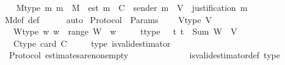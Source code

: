 \begin{isabellebody}
\endisatagproof
{\isafoldproof}%
%
\isadelimproof
\isanewline
%
\endisadelimproof
\isanewline
\ \ \isamarkupfalse%
\ M{\isacharunderscore}type{\isacharcolon}\ {\isachardoublequoteopen}{\isasymAnd}m{\isachardot}\ m\ {\isasymin}\ M\ {\isasymLongrightarrow}\ est\ m\ {\isasymin}\ C\ {\isasymand}\ sender\ m\ {\isasymin}\ V\ {\isasymand}\ justification\ m\ {\isasymin}\ {\isasymSigma}{\isachardoublequoteclose}\isanewline
%
\isadelimproof
\ \ \ \ %
\endisadelimproof
%
\isatagproof
{}\isamarkupfalse%
\ M{\isacharunderscore}def\ {\isasymSigma}{\isacharunderscore}def\isanewline
\ \ \ \ \isamarkupfalse%
\ auto%
\endisatagproof
{\isafoldproof}%
%
\isadelimproof
\isanewline
%
\endisadelimproof
\isanewline
{}\isamarkupfalse%
\isanewline
\isanewline
\isanewline
{}\isamarkupfalse%
\ Protocol\ {\isacharequal}\ Params\ {\isacharplus}\isanewline
\ \ \ V{\isacharunderscore}type{\isacharcolon}\ {\isachardoublequoteopen}V\ {\isasymnoteq}\ {\isasymemptyset}{\isachardoublequoteclose}\isanewline
\ \ \ W{\isacharunderscore}type{\isacharcolon}\ {\isachardoublequoteopen}{\isasymAnd}w{\isachardot}\ w\ {\isasymin}\ range\ W\ {\isasymLongrightarrow}\ w\ {\isachargreater}\ {}{\isachardoublequoteclose}\isanewline
\ \ \ t{\isacharunderscore}type{\isacharcolon}\ {\isachardoublequoteopen}{}\ {\isasymle}\ t{\isachardoublequoteclose}\ {\isachardoublequoteopen}t\ {\isacharless}\ Sum\ {\isacharparenleft}W\ {\isacharbackquote}\ V{\isacharparenright}{\isachardoublequoteclose}\isanewline
\ \ \ C{\isacharunderscore}type{\isacharcolon}\ {\isachardoublequoteopen}card\ C\ {\isachargreater}\ {}{\isachardoublequoteclose}\isanewline
\ \ \ {\isasymepsilon}{\isacharunderscore}type{\isacharcolon}\ {\isachardoublequoteopen}is{\isacharunderscore}valid{\isacharunderscore}estimator\ {\isasymepsilon}{\isachardoublequoteclose}\isanewline
\isanewline
{}\isamarkupfalse%
\ {\isacharparenleft}\ Protocol{\isacharparenright}\ estimates{\isacharunderscore}are{\isacharunderscore}non{\isacharunderscore}empty{\isacharcolon}\ {\isachardoublequoteopen}{\isasymAnd}\ {\isasymsigma}{\isachardot}\ {\isasymsigma}\ {\isasymin}\ {\isasymSigma}\ {\isasymLongrightarrow}\ {\isasymepsilon}\ {\isasymsigma}\ {\isasymnoteq}\ {\isasymemptyset}{\isachardoublequoteclose}\isanewline
%
\isadelimproof
\ \ %
\endisadelimproof
%
\isatagproof
{}\isamarkupfalse%
\ is{\isacharunderscore}valid{\isacharunderscore}estimator{\isacharunderscore}def\ {\isasymepsilon}{\isacharunderscore}type\ \isamarkupfalse%

\end{isabellebody}
